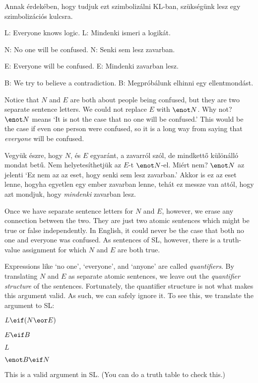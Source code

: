 Annak érdekében, hogy tudjuk ezt szimbolizálni KL-ban, szükségünk lesz egy szimbolizációs kulcsra.
\begin{ekey}
\item[L:] Everyone knows logic.
L: Mindenki ismeri a logikát.
\item[N:] No one will be confused.
N: Senki sem lesz zavarban.
\item[E:] Everyone will be confused.
E: Mindenki zavarban lesz.
\item[B:] We try to believe a contradiction.
B: Megpróbálunk elhinni egy ellentmondást.
\end{ekey}
Notice that $N$ and $E$ are both about people being confused, but they are two separate sentence letters. We could not replace $E$ with $\enot N$. Why not? $\enot N$ means `It is not the case that no one will be confused.' This would be the case if even one person were confused, so it is a long way from saying that \emph{everyone} will be confused.

Vegyük észre, hogy $N$, és $E$ egyaránt, a zavarról szól, de mindkettő különálló mondat betű. Nem helyetesíthetjük az $E$-t $\enot N$-el.  Miért nem?  $\enot N$ az jelenti  ‘Ez nem az az eset, hogy senki sem lesz zavarban.’ Akkor is ez az eset lenne, hogyha egyetlen egy ember zavarban lenne, tehát ez messze van attól, hogy azt mondjuk, hogy \emph{mindenki} zavarban lesz.



Once we have separate sentence letters for $N$ and $E$, however, we erase any connection between the two. They are just two atomic sentences which might be true or false independently. In English, it could never be the case that both no one and everyone was confused. As sentences of SL, however, there is a truth-value assignment for which $N$ and $E$ are both true.

Expressions like `no one', `everyone', and `anyone' are called \emph{quantifiers}. By translating $N$ and $E$ as separate atomic sentences, we leave out the \emph{quantifier structure} of the sentences. Fortunately, the quantifier structure is not what makes this argument valid. As such, we can safely ignore it. To see this, we translate the argument to SL:
\begin{earg}
\item[]$L \eif (N \eor E)$
\item[]$E \eif B$
\item[]$L$
\item[\therefore]$\enot B \eif N$
\end{earg}
This is a valid argument in SL. (You can do a truth table to check this.) 

